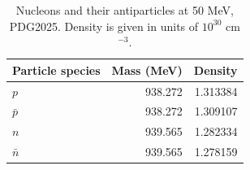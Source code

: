 \begin{table}[t]\centering\small
\caption{Nucleons and their antiparticles at 50 MeV, PDG2025. Density is given in units of $10^{30}$ cm$^{-3}$.}
\label{tab:nucleons50}
\begin{tabular}{lrr}\toprule
Particle species & Mass (MeV) & Density\\\midrule
$p$ & 938.272 & 1.313384\\
$\bar p$ & 938.272 & 1.309107\\
$n$ & 939.565 & 1.282334\\
$\bar n$ & 939.565 & 1.278159\\
\bottomrule\end{tabular}
\end{table}
